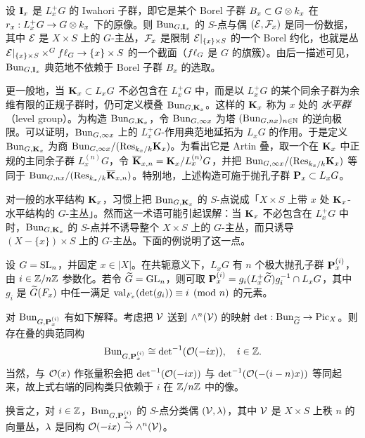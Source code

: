\begin{exam} 设 $\mathbf{I}_{x}$ 是 $L^{+}_{x}G$ 的 Iwahori 子群，即它是某个 Borel 子群 $B_{x}\subset G\otimes k_{x}$ 在 $r_{x}: L^{+}_{x}G\to G\otimes k_{x}$ 下的原像。则 $\textup{Bun}_{G,\mathbf{I}_{x}}$ 的 $S$-点与偶 $(\mathcal{E}, \mathcal{F}_{x})$ 是同一份数据，其中 $\mathcal{E}$ 是 $X\times S$ 上的 $G$-主丛，$\mathcal{F}_{x}$ 是限制 $\mathcal{E}|_{\{x\}\times S}$ 的一个 Borel 约化，也就是丛 $\mathcal{E}|_{\{x\}\times S}\times^{G}f\ell_{G}\to \{x\}\times S$ 的一个截面（$f\ell_{G}$ 是 $G$ 的旗簇）。由后一描述可见，$\textup{Bun}_{G,\mathbf{I}_{x}}$ 典范地不依赖于 Borel 子群 $B_{x}$ 的选取。
\end{exam}

更一般地，当 $\mathbf{K}_{x}\subset L_{x}G$ 不必包含在 $L^{+}_{x}G$ 中，而是以 $L^{+}_{x}G$ 的某个同余子群为余维有限的正规子群时，仍可定义模叠 $\textup{Bun}_{G,\mathbf{K}_{x}}$。这样的 $\mathbf{K}_{x}$ 称为 $x$ 处的 {\em 水平群}（level group）。为构造 $\textup{Bun}_{G,\mathbf{K}_{x}}$，令 $\textup{Bun}_{G, \infty x}$ 为塔 $(\textup{Bun}_{G,nx})_{n\in\mathbb{N}}$ 的逆向极限。可以证明，$\textup{Bun}_{G,\infty x}$ 上的 $L^{+}_{x}G$-作用典范地延拓为 $L_{x}G$ 的作用。于是定义 $\textup{Bun}_{G,\mathbf{K}_{x}}$ 为商 $\textup{Bun}_{G,\infty x}/(\textup{Res}_{k_{x}/k}\mathbf{K}_{x})$。为看出它是 Artin 叠，取一个在 $\mathbf{K}_{x}$ 中正规的主同余子群 $L^{(n)}_{x}G$，令 $\overline {\mathbf{K}}_{x,n}=\mathbf{K}_{x}/L^{(n)}_{x}G$，并把 $\textup{Bun}_{G,\infty x}/(\textup{Res}_{k_{x}/k}\mathbf{K}_{x})$ 等同于 $\textup{Bun}_{G,nx}/(\textup{Res}_{k_{x}/k}\overline{\mathbf{K}}_{x,n})$。特别地，上述构造可施于抛孔子群 $\mathbf{P}_{x}\subset L_{x}G$。

\begin{rmk} 对一般的水平结构 $\mathbf{K}_{x}$，习惯上把 $\textup{Bun}_{G,\mathbf{K}_{x}}$ 的 $S$-点说成「$X\times S$ 上带 $x$ 处 $\mathbf{K}_{x}$-水平结构的 $G$-主丛」。然而这一术语可能引起误解：当 $\mathbf{K}_{x}$ 不必包含在 $L^{+}_{x}G$ 中时，$\textup{Bun}_{G,\mathbf{K}_{x}}$ 的 $S$-点并不诱导整个 $X\times S$ 上的 $G$-主丛，而只诱导 $(X-\{x\})\times S$ 上的 $G$-主丛。下面的例说明了这一点。
\end{rmk}



\begin{exam}\label{ex:SL parahoric} 设 $G=\textup{SL}_{n}$，并固定 $x\in |X|$。在共轭意义下，$L_{x}G$ 有 $n$ 个极大抛孔子群 $\mathbf{P}^{(i)}_{x}$，由 $i\in \mathbb{Z}/n\mathbb{Z}$ 参数化。若令 $\widetilde{G}=\textup{GL}_{n}$，则可取 $\mathbf{P}^{(i)}_{x}=g_{i}(L^{+}_{x}\widetilde{G})g_{i}^{-1}\cap L_{x}G$，其中 $g_{i}$ 是 $\widetilde{G}(F_{x})$ 中任一满足 $\textup{val}_{F_{x}}(\det(g_{i}))\equiv i\pmod{n}$ 的元素。

对 $\textup{Bun}_{G, \mathbf{P}^{(i)}_{x}}$ 有如下解释。考虑把 $\mathcal{V}$ 送到 $\wedge^{n}(\mathcal{V})$ 的映射 $\det: \textup{Bun}_{\widetilde{G}}\to \textup{Pic}_{X}$。则存在叠的典范同构
\begin{equation*}
\textup{Bun}_{G, \mathbf{P}^{(i)}_{x}}\cong {\det}^{-1}(\mathcal{O}(-ix)), \quad i\in \mathbb{Z}.
\end{equation*}
当然，与 $\mathcal{O}(x)$ 作张量积会把 $\det^{-1}(\mathcal{O}(-ix))$ 与 $\det^{-1}(\mathcal{O}(-(i-n)x))$ 等同起来，故上式右端的同构类只依赖于 $i$ 在 $\mathbb{Z}/n\mathbb{Z}$ 中的像。

换言之，对 $i\in \mathbb{Z}$，$\textup{Bun}_{G, \mathbf{P}^{(i)}_{x}}$ 的 $S$-点分类偶 $(\mathcal{V},\lambda)$，其中 $\mathcal{V}$ 是 $X\times S$ 上秩 $n$ 的向量丛，$\lambda$ 是同构 $\mathcal{O}(-ix)\stackrel{\sim}{\to} \wedge^{n}(\mathcal{V})$。
\end{exam}


